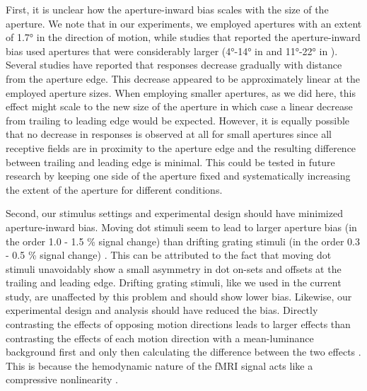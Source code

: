 First, it is unclear how the aperture-inward bias scales with the size of the aperture. We note that in our experiments, we employed apertures with an extent of 1.7° in the direction of motion, while studies that reported the aperture-inward bias used apertures that were considerably larger (4°-14° in \cite{Schellekens2016} and 11°-22° in \cite{Wang2014}). Several studies \parencite{Wang2014, Schellekens2015, Schellekens2016} have reported that responses decrease gradually with distance from the aperture edge. This decrease appeared to be approximately linear \parencite{Schellekens2015} at the employed aperture sizes. When employing smaller apertures, as we did here, this effect might scale to the new size of the aperture in which case a linear decrease from trailing to leading edge would be expected. However, it is equally possible that no decrease in responses is observed at all for small apertures since all receptive fields are in proximity to the aperture edge and the resulting difference between trailing and leading edge is minimal. This could be tested in future research by keeping one side of the aperture fixed and systematically increasing the extent of the aperture for different conditions.

Second, our stimulus settings and experimental design should have minimized aperture-inward bias. Moving dot stimuli seem to lead to larger aperture bias (in the order 1.0 - 1.5 \% signal change) \parencite{Wang2014, Schellekens2016} than drifting grating stimuli (in the order 0.3 - 0.5 \% signal change) \parencite{Whitney2003, Liu2006}. This can be attributed to the fact that moving dot stimuli unavoidably show a small asymmetry in dot on-sets and offsets at the trailing and leading edge. Drifting grating stimuli, like we used in the current study, are unaffected by this problem and should show lower bias. Likewise, our experimental design and analysis should have reduced the bias. Directly contrasting the effects of opposing motion directions leads to larger effects than contrasting the effects of each motion direction with a mean-luminance background first and only then calculating the difference between the two effects \parencite{Liu2006}. This is because the hemodynamic nature of the fMRI signal acts like a compressive nonlinearity \parencite{Liu2006}. 


